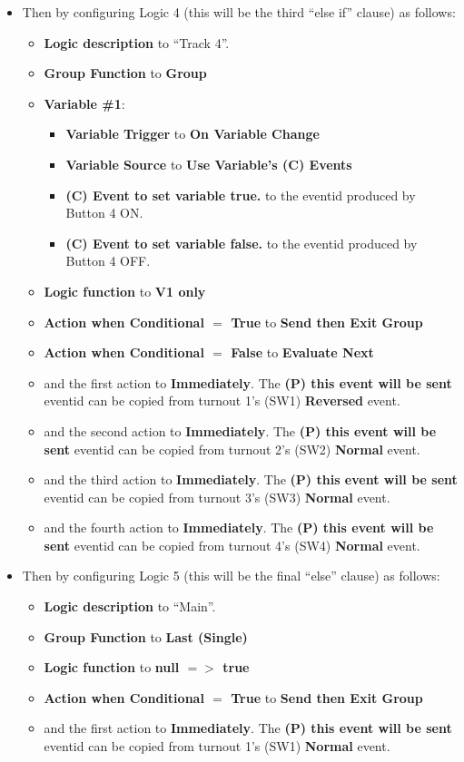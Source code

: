 \begin{itemize}
\item Then by configuring Logic 4 (this will be the third ``else if'' clause) 
as follows:
\begin{itemize}
\item \textbf{Logic description} to ``Track 4''.
\item \textbf{Group Function} to \textbf{Group}
\item \textbf{Variable \#1}:
\begin{itemize}
\item \textbf{Variable Trigger} to \textbf{On Variable Change}
\item \textbf{Variable Source} to \textbf{Use Variable's (C) Events}
\item \textbf{(C) Event to set variable true.} to the eventid produced by 
Button 4 ON.
\item \textbf{(C) Event to set variable false.} to the eventid produced by 
Button 4 OFF.
\end{itemize}
\item \textbf{Logic function} to \textbf{V1 only}
\item \textbf{Action when Conditional $=$ True} to \textbf{Send then Exit 
Group}
\item \textbf{Action when Conditional $=$ False} to \textbf{Evaluate Next}
\item and the first action to \textbf{Immediately}.  The \textbf{(P) this 
event will be sent} eventid can be copied from turnout 1's (SW1) 
\textbf{Reversed} event.
\item and the second action to \textbf{Immediately}.  The \textbf{(P) this 
event will be sent} eventid can be copied from turnout 2's (SW2) 
\textbf{Normal} event.
\item and the third action to \textbf{Immediately}.  The \textbf{(P) this 
event will be sent} eventid can be copied from turnout 3's (SW3) 
\textbf{Normal} event.
\item and the fourth action to \textbf{Immediately}.  The \textbf{(P) this 
event will be sent} eventid can be copied from turnout 4's (SW4) 
\textbf{Normal} event.
\end{itemize}

\item Then by configuring Logic 5 (this will be the final ``else'' clause) as 
follows: 
\begin{itemize}
\item \textbf{Logic description} to ``Main''.
\item \textbf{Group Function} to \textbf{Last (Single)}
\item \textbf{Logic function} to \textbf{null $=>$ true}
\item \textbf{Action when Conditional $=$ True} to \textbf{Send then Exit 
Group}
\item and the first action to \textbf{Immediately}.  The \textbf{(P) this      
event will be sent} eventid can be copied from turnout 1's (SW1) 
\textbf{Normal} event.
\end{itemize}
\end{itemize}
 


